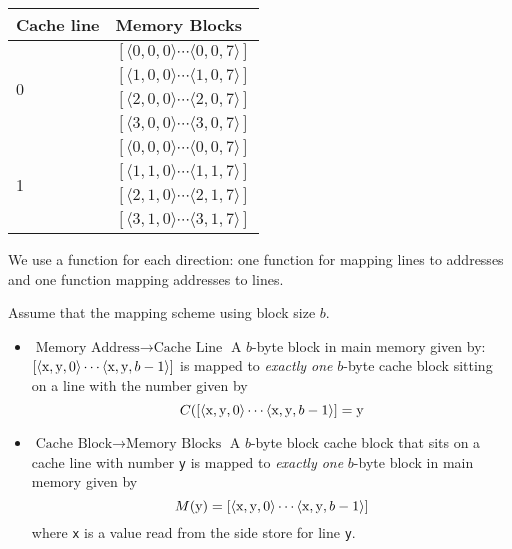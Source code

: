 \begin{center}
  \begin{tabular}{ |l|l| }
    \hline
    Cache line & Memory Blocks \\ 
    \hline
    \multirow{4}{*}{0} 
     & $[\langle 0,0,0 \rangle \dotsm \langle 0,0,7 \rangle]$ \\
     & $[\langle 1,0,0 \rangle \dotsm \langle 1,0,7 \rangle]$ \\
     & $[\langle 2,0,0 \rangle \dotsm \langle 2,0,7 \rangle]$ \\
     & $[\langle 3,0,0 \rangle \dotsm \langle 3,0,7 \rangle]$ \\ 
    \hline
    \multirow{4}{*}{1}
     & $[\langle 0,0,0 \rangle \dotsm \langle 0,0,7 \rangle]$ \\
     & $[\langle 1,1,0 \rangle \dotsm \langle 1,1,7 \rangle]$ \\
     & $[\langle 2,1,0 \rangle \dotsm \langle 2,1,7 \rangle]$ \\
     & $[\langle 3,1,0 \rangle \dotsm \langle 3,1,7 \rangle]$ \\ 
    \hline
  \end{tabular}
\end{center}




\frmrule

We use a function for each direction: one function for 
mapping lines to addresses and one function mapping addresses to lines. 

Assume that the mapping scheme using block size $b$. 
\begin{itemize}	
\renewcommand{\labelitemi}{$\Box$}
\item \textbf{$\text{Memory Address} \rightarrow \text{Cache Line}$} 
A $b$-byte block in main memory given by:
$ [\langle \text{\lstinline{x}}, \text{\lstinline{y}}, 0 \rangle
\dotsm \langle \text{\lstinline{x}}, \text{\lstinline{y}}, b-1 \rangle]$
is mapped to \textit{exactly one} $b$-byte cache block sitting on a line with the 
number given by
$$C([\langle \text{\lstinline{x}}, \text{\lstinline{y}}, 0 \rangle
\dotsm \langle \text{\lstinline{x}}, \text{\lstinline{y}}, b-1 \rangle]
= \text{\lstinline{y}}$$

\item \textbf{$\text{Cache Block} \rightarrow \text{Memory Blocks}$} 
A $b$-byte block cache block that sits on a cache line with number \lstinline{y}
is mapped to \textit{exactly one} $b$-byte block in main memory given by 
$$M(\text{\lstinline{y}}) = [
\langle \text{\lstinline{x}}, \text{\lstinline{y}}, 0 \rangle
\dotsm
\langle \text{\lstinline{x}}, \text{\lstinline{y}}, b-1 \rangle]$$
where \lstinline{x} is a value read from the side store for line \lstinline{y}.
\end{itemize}

